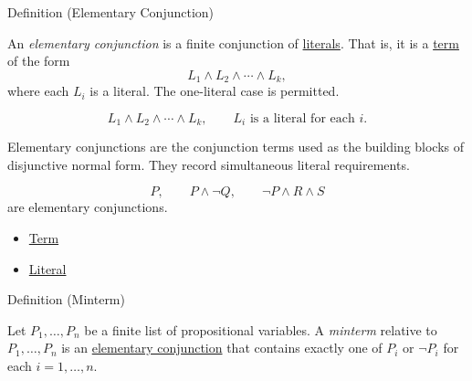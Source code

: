 \begin{definitionbox}{Definition (Elementary Conjunction)}
\begin{definition}
\label{def:elementary-conjunction-propositional-logic}
An \emph{elementary conjunction} is a finite conjunction of
\hyperref[def:literal-propositional-logic]{literals}. That is, it is a
\hyperref[def:term-propositional-logic]{term} of the form
\[
L_1\land L_2\land\cdots\land L_k,
\]
where each \(L_i\) is a literal. The one-literal case is permitted.
\end{definition}
\end{definitionbox}

\begin{remark*}
\[
L_1\land L_2\land\cdots\land L_k,
\qquad
L_i\text{ is a literal for each }i.
\]
\end{remark*}

\begin{remark*}[Interpretation]
Elementary conjunctions are the conjunction terms used as the building blocks
of disjunctive normal form. They record simultaneous literal requirements.
\end{remark*}

\begin{example*}[Examples]
\[
P,\qquad P\land\neg Q,\qquad \neg P\land R\land S
\]
are elementary conjunctions.
\end{example*}

\begin{dependencies}
\begin{itemize}
  \item \hyperref[def:term-propositional-logic]{Term}
  \item \hyperref[def:literal-propositional-logic]{Literal}
\end{itemize}
\end{dependencies}

\begin{definitionbox}{Definition (Minterm)}
\begin{definition}[Minterm]
\label{def:minterm-propositional-logic}
Let \(P_1,\ldots,P_n\) be a finite list of propositional variables. A
\emph{minterm} relative to \(P_1,\ldots,P_n\) is an
\hyperref[def:elementary-conjunction-propositional-logic]{elementary conjunction}
that contains exactly one of \(P_i\) or \(\neg P_i\) for each
\(i=1,\ldots,n\).
\end{definition}
\end{definitionbox}

